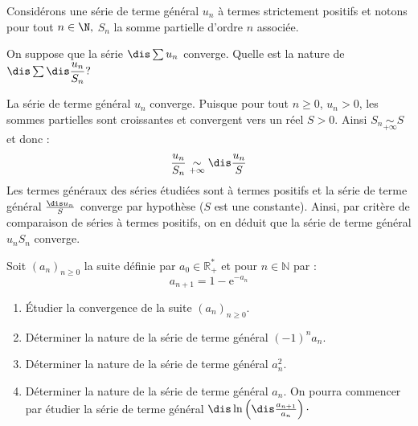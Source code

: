 \documentclass[a4paper,10pt]{report}
\begin{document}
\begin{Exa} Considérons une série de terme général $u_n$ à termes strictement positifs et notons pour tout $n\in\N,$ $S_n$ la somme partielle d'ordre $n$ associée. 

On suppose que la s\'erie $\dis \sum u_n$ converge. Quelle est la nature de $\dis \sum \dis \dfrac{u_n}{S_n}?$
\end{Exa}

\corr La s\'erie de terme général $u_n$ converge. Puisque pour tout $n \geq 0$, $u_n>0$, les sommes partielles sont croissantes et convergent vers un réel $S>0.$ Ainsi $S_n \underset{+ \infty}{\sim} S$ et donc :
$$\frac{u_n}{S_n}\underset{+ \infty}{\sim} \dis\frac{u_n}{S}$$
Les termes généraux des séries étudiées sont à termes positifs et la s\'erie de terme général $\dis u_n \over S$ converge par hypothèse ($S$ est une constante). Ainsi, par critère de comparaison de séries à termes positifs, on en déduit que la s\'erie de terme général ${u_n}{S_n}$ converge.

\begin{Exa} Soit $(a_n )_{n \geq 0} $ la suite d\'efinie par $a_0  \in \mathbb{R}^{*}_+$ et pour $n \in \mathbb{N}$ par :
$$a_{n + 1}  = 1 - {\mathrm{e}}^{ - a_n } $$
\begin{enumerate}
	\item Étudier la convergence de la suite $(a_n )_{n \geq 0}$.
	
\item D\'eterminer la nature de la s\'erie de terme g\'en\'eral $( - 1)^n a_n.$
	
	\item D\'eterminer la nature de la s\'erie de terme g\'en\'eral $a_n^2 $.
	
	\item  D\'eterminer la nature de la s\'erie de terme g\'en\'eral $a_n $. On pourra commencer par étudier la s\'erie de terme général $\dis \ln \left( {\dis\frac{{a_{n + 1} }}{{a_n }}} \right) \cdot$
\end{enumerate}
\end{Exa}
\end{document}
